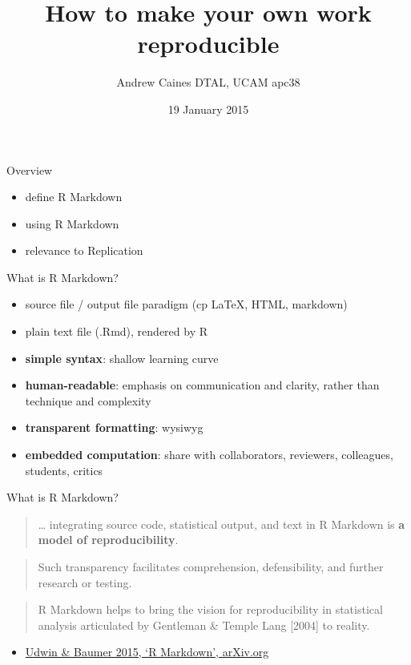 \documentclass[ignorenonframetext,]{beamer}
\title{How to make your own work reproducible}
\author{Andrew Caines \textbar{} DTAL, UCAM \textbar{} apc38}
\date{19 January 2015}
\begin{document}
\frame{\titlepage}

\begin{frame}
\tableofcontents[hideallsubsections]
\end{frame}

\begin{frame}{Overview}

\begin{itemize}[<+->]
\itemsep1pt\parskip0pt
\item
  define R Markdown
\item
  using R Markdown
\item
  relevance to Replication
\end{itemize}

\end{frame}

\begin{frame}{What is R Markdown?}

\begin{itemize}[<+->]
\itemsep1pt\parskip0pt
\item
  source file / output file paradigm (cp LaTeX, HTML, markdown)
\item
  plain text file (.Rmd), rendered by R
\item
  \textbf{simple syntax}: shallow learning curve
\item
  \textbf{human-readable}: emphasis on communication and clarity, rather
  than technique and complexity
\item
  \textbf{transparent formatting}: wysiwyg
\item
  \textbf{embedded computation}: share with collaborators, reviewers,
  colleagues, students, critics
\end{itemize}

\end{frame}

\begin{frame}{What is R Markdown?}

\begin{quote}
\ldots{} integrating source code, statistical output, and text in R
Markdown is \textbf{a model of reproducibility}.
\end{quote}

\begin{quote}
Such transparency facilitates comprehension, defensibility, and further
research or testing.
\end{quote}

\begin{quote}
R Markdown helps to bring the vision for reproducibility in statistical
analysis articulated by Gentleman \& Temple Lang {[}2004{]} to reality.
\end{quote}

\begin{itemize}[<+->]
\itemsep1pt\parskip0pt
\item
  \href{http://arxiv.org/abs/1501.01613}{Udwin \& Baumer 2015, `R
  Markdown', arXiv.org}
\end{itemize}

\end{frame}
\end{document}
